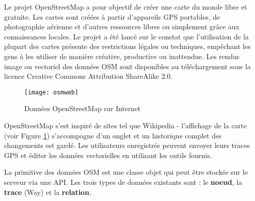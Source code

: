 
Le projet OpenStreetMap a pour objectif de créer une carte du monde libre et gratuite. Les cartes sont créées à partir d'appareils GPS portables, de photographie aérienne et d'autres ressources libres ou simplement grâce aux connaissances locales. Le projet a été lancé sur le constat que l'utilisation de la plupart des cartes présente des restrictions légales ou techniques, empêchant les gens à les utiliser de manière créative, productive ou inattendue. Les rendus image ou vectoriel des données OSM sont disponibles au téléchargement sous la licence Creative Commons Attribution ShareAlike 2.0.

\begin{figure}[ht]
\centering
  
   \texttt{[image: osmweb]}
   \caption{Données OpenStreetMap sur Internet \nixcaption}\label{fig:osmweb}
\end{figure}

OpenStreetMap s'est inspiré de sites tel que Wikipedia - l'affichage de la carte (voir Figure \ref{fig:osmweb}) s'accompagne d'un onglet  et un historique complet des changements est gardé. Les utilisateurs enregistrés peuvent envoyer leurs traces GPS et éditer les données vectorielles en utilisant les outils fournis.

La primitive des données OSM est une classe objet qui peut être stockée sur le serveur via une API. Les trois types de données existants sont : le \textbf{noeud}, la \textbf{trace} (Way) et la \textbf{relation}.


